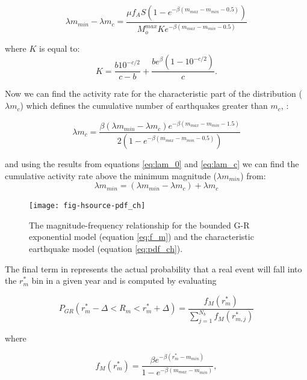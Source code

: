 \begin{enumerate}
\begin{equation} \label{eq:lam_0}
\lambda m_{min} - \lambda m_{c} = \frac { \mu f_A S (1-e ^{- \beta (m_{max} - m_{min} - 0.5)}) } { M_o^{max} K e ^{- \beta (m_{max} - m_{min} - 0.5)  }  }
\end{equation}

where $K$ is equal to:
\begin{equation}
K = \frac { b 10 ^ {-c/2} }  { c- b } + \frac { b e ^{\beta} (1 - 10^{-c/2})  }  {  c } .
\end{equation}

Now we can find  the activity rate for the characteristic part of the distribution ($\lambda m_{c}$) which defines the cumulative number of earthquakes greater than $m_c$,  :

\begin{equation} \label{eq:lam_c}
\lambda m_c = \frac { \beta (\lambda m_{min} - \lambda m_{c}) e ^{-\beta ( m_{max} - m_{min} - 1.5)} }  { 2 ( 1 -  e ^{- \beta (m_{max} - m_{min} - 0.5)  }) }
\end{equation}

and using the results from equations \ref{eq:lam_0} and \ref{eq:lam_c} we can find the cumulative activity rate above the minimum magnitude ($\lambda m_{min}$) from:
\begin{equation} \label{eq:lam_ch}
\lambda m_{min} = (\lambda m_{min} - \lambda m_{c}) + \lambda m_{c}
\end{equation}

\begin{figure}[htp]
\centerline{\texttt{[image: fig-hsource-pdf\_ch]}}
\caption{The magnitude-frequency relationship for the bounded G-R exponential model (equation \ref{eq:f_m}) and the characteristic earthquake model (equation \ref{eq:pdf_ch}).}
\label{fig:pdf}
\end{figure}

The final term in 
represents the actual probability that a real event will fall into
the $r_m^*$ bin in a given year and is computed by evaluating

\begin{equation}
P_{GR}(r_m^*-\Delta<R_m<r_m^*+\Delta) =
\frac{f_M(r_m^*)}{\sum\limits_{j=1}^{N_b} f_M(r_{m,j}^*)}
\end{equation}

where

\begin{equation} \label{eq:f_m}
f_M(r_m^*) = \frac{\beta
e^{-\beta(r_m^*-m_{min})}}{1-e^{-\beta(m_{max}-m_{min})}},
\end{equation}


\end{enumerate}
